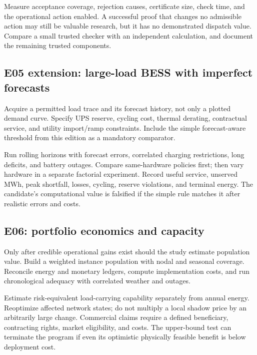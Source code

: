 \documentclass[11pt,letterpaper]{article}
\begin{document}
Measure acceptance coverage, rejection causes, certificate size, check time, and the operational action enabled. A successful proof that changes no admissible action may still be valuable research, but it has no demonstrated dispatch value. Compare a small trusted checker with an independent calculation, and document the remaining trusted components.

\subsection{E05 extension: large-load BESS with imperfect forecasts}
Acquire a permitted load trace and its forecast history, not only a plotted demand curve. Specify UPS reserve, cycling cost, thermal derating, contractual service, and utility import/ramp constraints. Include the simple forecast-aware threshold from this edition as a mandatory comparator.

Run rolling horizons with forecast errors, correlated charging restrictions, long deficits, and battery outages. Compare same-hardware policies first; then vary hardware in a separate factorial experiment. Record useful service, unserved MWh, peak shortfall, losses, cycling, reserve violations, and terminal energy. The candidate's computational value is falsified if the simple rule matches it after realistic errors and costs.

\subsection{E06: portfolio economics and capacity}
Only after credible operational gains exist should the study estimate population value. Build a weighted instance population with nodal and seasonal coverage. Reconcile energy and monetary ledgers, compute implementation costs, and run chronological adequacy with correlated weather and outages.

Estimate risk-equivalent load-carrying capability separately from annual energy. Reoptimize affected network states; do not multiply a local shadow price by an arbitrarily large change. Commercial claims require a defined beneficiary, contracting rights, market eligibility, and costs. The upper-bound test can terminate the program if even its optimistic physically feasible benefit is below deployment cost.
\end{document}
